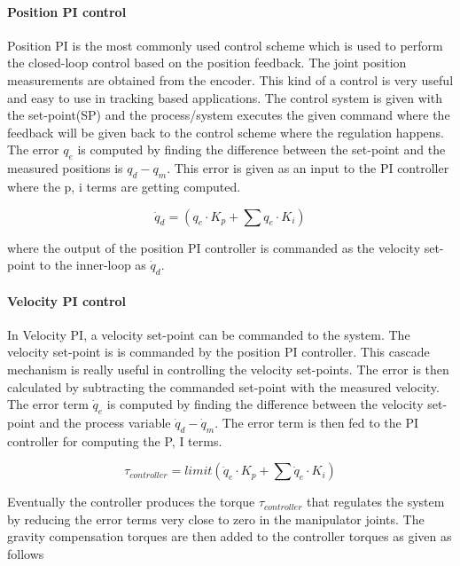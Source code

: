 \paragraph*{Position PI control}

Position PI is the most commonly used control scheme which is used to perform the closed-loop control based on the position feedback. The joint position measurements are obtained from the encoder. This kind of a control is very useful and easy to use in tracking based applications. The control system is given with the set-point(SP) and the process/system executes the given command where the feedback will be given back to the control scheme where the regulation happens. The error $q_e$ is computed by finding the difference between the set-point and the measured positions is $q_d - q_m$. This error is given as an input to the PI controller where the p, i terms are getting computed.

\begin{equation}
\dot{q}_d = (q_e\cdot K_p + \sum q_e\cdot K_i)
\end{equation}

where the output of the position PI controller is commanded as the velocity set-point to the inner-loop as $\dot{q}_d$. 

\paragraph*{Velocity PI control}
In Velocity PI, a velocity set-point can be commanded to the system. The velocity set-point is is commanded by the position PI controller. This cascade mechanism is really useful in controlling the velocity set-points. The error is then calculated by subtracting the commanded set-point with the measured velocity. The error term $\dot{q}_e$ is computed by finding the difference between the velocity set-point and the process variable $\dot{q}_d - \dot{q}_m$. The error term is then fed to the PI controller for computing the P, I terms. 

\begin{equation}
\tau_{controller} = limit(\dot{q}_e\cdot K_p + \sum \dot{q}_e\cdot K_i)
\end{equation}

Eventually the controller produces the torque $\tau_{controller}$ that regulates the system by reducing the error terms very close to zero in the manipulator joints. The gravity compensation torques are then added to the controller torques as given as follows

